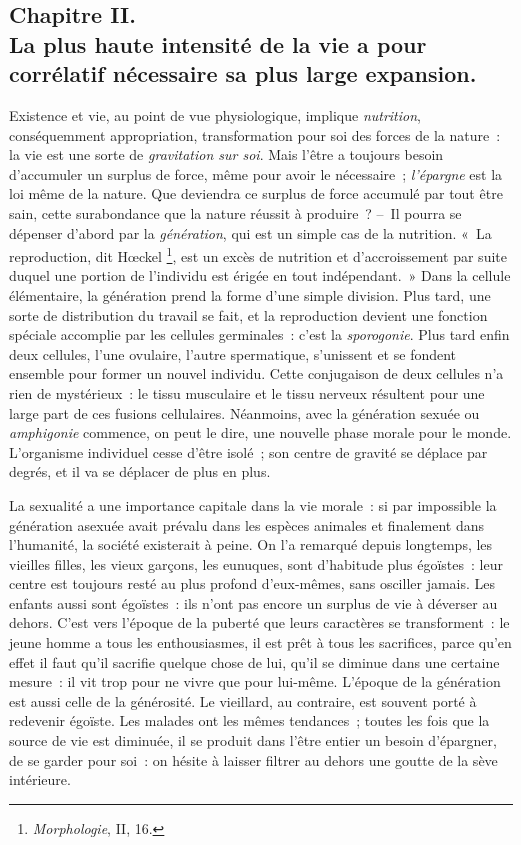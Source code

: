\documentclass[french,twoside]{book} %
\begin{document}
\subsection[{Chapitre II. La plus haute intensité de la vie a pour corrélatif nécessaire sa plus large expansion.}]{Chapitre II. \\
La plus haute intensité de la vie a pour corrélatif nécessaire sa plus large expansion.}
\noindent Existence et vie, au point de vue physiologique, implique \emph{nutrition}, conséquemment appropriation, transformation pour soi des forces de la nature : la vie est une sorte de \emph{gravitation sur soi}. Mais l’être a toujours besoin d’accumuler un surplus de force, même pour avoir le nécessaire ; \emph{l’épargne} est la loi même de la nature. Que deviendra ce surplus de force accumulé par tout être sain, cette surabondance que la nature réussit à produire ? – Il pourra se dépenser d’abord par la \emph{génération}, qui est un simple cas de la nutrition. « La reproduction, dit Hœckel \footnote{\emph{Morphologie}, II, 16.}, est un excès de nutrition et d’accroissement par suite duquel une portion de l’individu est érigée en tout indépendant. » Dans la cellule élémentaire, la génération prend la forme d’une simple division. Plus tard, une sorte de distribution du travail se fait, et la reproduction devient une fonction spéciale accomplie par les cellules germinales : c’est la \emph{sporogonie}. Plus tard enfin deux cellules, l’une ovulaire, l’autre spermatique, s’unissent et se fondent ensemble pour former un nouvel individu. Cette conjugaison de deux cellules n’a rien de mystérieux : le tissu musculaire et le tissu nerveux résultent pour une large part de ces fusions cellulaires. Néanmoins, avec la génération sexuée ou \emph{amphigonie} commence, on peut le dire, une nouvelle phase morale pour le monde. L’organisme individuel cesse d’être isolé ; son centre de gravité se déplace par degrés, et il va se déplacer de plus en plus.\par
La sexualité a une importance capitale dans la vie morale : si par impossible la génération asexuée avait prévalu dans les espèces animales et finalement dans l’humanité, la société existerait à peine. On l’a remarqué depuis longtemps, les vieilles filles, les vieux garçons, les eunuques, sont d’habitude plus égoïstes : leur centre est toujours resté au plus profond d’eux-mêmes, sans osciller jamais. Les enfants aussi sont égoïstes : ils n’ont pas encore un surplus de vie à déverser au dehors. C’est vers l’époque de la puberté que leurs caractères se transforment : le jeune homme a tous les enthousiasmes, il est prêt à tous les sacrifices, parce qu’en effet il faut qu’il sacrifie quelque chose de lui, qu’il se diminue dans une certaine mesure : il vit trop pour ne vivre que pour lui-même. L’époque de la génération est aussi celle de la générosité. Le vieillard, au contraire, est souvent porté à redevenir égoïste. Les malades ont les mêmes tendances ; toutes les fois que la source de vie est diminuée, il se produit dans l’être entier un besoin d’épargner, de se garder pour soi : on hésite à laisser filtrer au dehors une goutte de la sève intérieure.\par
\end{document}
